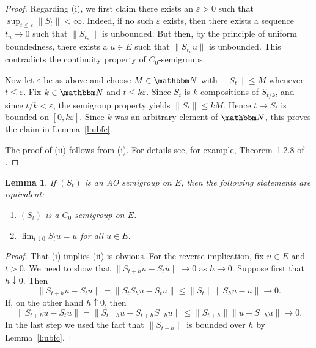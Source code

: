 \documentclass[12pt, reqno]{amsart}
\renewcommand{\leq}{\leqslant}
\newcommand{\1}{\mathbbm 1}
\newcommand{\NN}{\mathbbm N}
\renewcommand{\epsilon}{\varepsilon}
\theoremstyle{plain}
\newtheorem{lemma}[theorem]{Lemma}
\theoremstyle{definition}
\begin{document}
\begin{proof}
    Regarding (i), we first claim there exists an $\epsilon > 0$ such that $
    \sup_{t \leq \epsilon} \| S_t \| < \infty$.  Indeed, if no such $\epsilon$
    exists, then there exists a sequence $t_n \to 0$ such that 
    $\|S_{t_n}\|$ is unbounded.  But then, by the principle of uniform
    boundedness, there exists a $u \in E$ such that $\|S_{t_n} u\|$ is
    unbounded.  This contradicts the continuity property of $C_0$-semigroups.

    Now let $\epsilon$ be as above and choose $M \in \NN$ with $\| S_t \| \leq
    M$ whenever $t \leq \epsilon$.  Fix $k \in \NN$ and $t \leq k \epsilon$.
    Since $S_t$ is $k$ compositions of $S_{t/k}$, and since $t/k < \epsilon$, 
    the semigroup property yields $\| S_t \| \leq k M$.  Hence $t \mapsto S_t$
    is bounded on $[0, k \epsilon]$.  Since $k$ was an arbitrary element of
    $\NN$, this proves the claim in Lemma~\ref{l:ubfc}.

    The proof of (ii) follows from (i).  For details see, for example,
    Theorem~1.2.8 of \cite{applebaum2019semigroups}.
\end{proof}

\begin{lemma}\label{l:semiequivcon}
    If $(S_t)$ is an AO semigroup on $E$, then the following
    statements are equivalent:
    \begin{enumerate}
        \item $(S_t)$ is a $C_0$-semigroup on $E$.
        \item $\lim_{t \downarrow 0} S_t u = u$ for all $u \in E$.
    \end{enumerate}
\end{lemma}

\begin{proof}
    That (i) implies (ii) is obvious.  For the reverse implication, fix $u \in E$ and $t > 0$.  We
    need to show that $\|S_{t+h} u - S_t u\| \to 0$ as $h \to 0$.  Suppose first
    that $h \downarrow 0$.  Then
    \begin{equation*}
        \|S_{t+h} u - S_t u\|  
        = \|S_t S_h u - S_t u\|  
        \leq \|S_t \| \| S_h u - u\|  \to 0.
    \end{equation*}
    If, on the other hand $h \uparrow 0$, then
    \begin{equation*}
        \|S_{t+h} u - S_t u\|  
        = \|S_{t+h} u - S_{t + h} S_{-h} u\|  
        \leq \|S_{t+h} \| \| u - S_{-h} u\| \to 0 .
    \end{equation*}
    In the last step we used the fact that $\|S_{t+h} \| $ is bounded over $h$
    by Lemma~\ref{l:ubfc}.
\end{proof}
\end{document}
